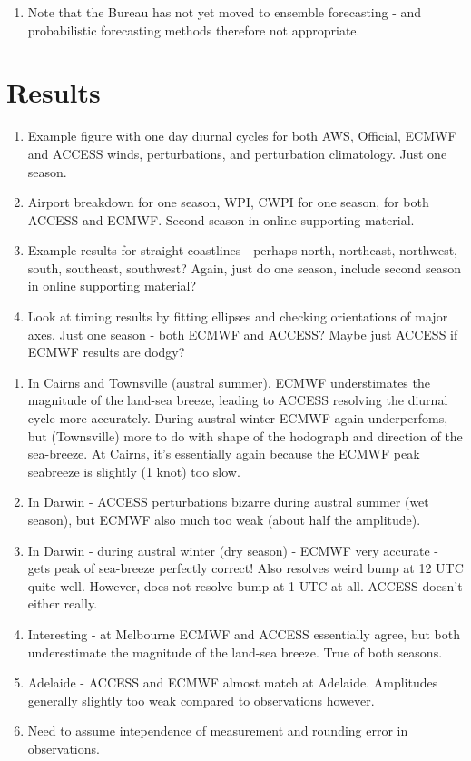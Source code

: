 \documentclass[alpha-refs]{wiley-article}
\begin{document}
\begin{enumerate}
\item
Note that the Bureau has not yet moved to ensemble forecasting - and probabilistic forecasting methods therefore not appropriate. 
\end{enumerate}

\section{Results}
\label{results}

\begin{enumerate}
\item
Example figure with one day diurnal cycles for both AWS, Official, ECMWF and ACCESS winds, perturbations, and perturbation climatology. Just one season.
\item
Airport breakdown for one season, WPI, CWPI for one season, for both ACCESS and ECMWF. Second season in online supporting material.
\item
Example results for straight coastlines - perhaps north, northeast, northwest, south, southeast, southwest? Again, just do one season, include second season in online supporting material?
\item
Look at timing results by fitting ellipses and checking orientations of major axes. Just one season - both ECMWF and ACCESS? Maybe just ACCESS if ECMWF results are dodgy?
\end{enumerate}

\begin{enumerate}
\item
In Cairns and Townsville (austral summer), ECMWF understimates the magnitude of the land-sea breeze, leading to ACCESS resolving the diurnal cycle more accurately. During austral winter ECMWF again underperfoms, but (Townsville) more to do with shape of the hodograph and direction of the sea-breeze. At Cairns, it's essentially again because the ECMWF peak seabreeze is slightly (1 knot) too slow.   
\item
In Darwin - ACCESS perturbations bizarre during austral summer (wet season), but ECMWF also much too weak (about half the amplitude). 
\item
In Darwin - during austral winter (dry season) - ECMWF very accurate - gets peak of sea-breeze perfectly correct! Also resolves weird bump at 12 UTC quite well. However, does not resolve bump at 1 UTC at all. ACCESS doesn't either really. 
\item
Interesting - at Melbourne ECMWF and ACCESS essentially agree, but both underestimate the magnitude of the land-sea breeze. True of both seasons. 
\item
Adelaide - ACCESS and ECMWF almost match at Adelaide. Amplitudes generally slightly too weak compared to observations however. 
\item
Need to assume intependence of measurement and rounding error in observations. 
\end{enumerate}
\end{document}
